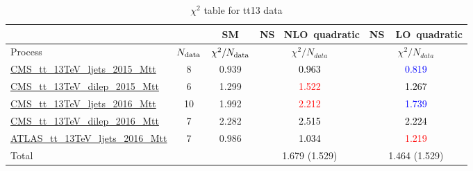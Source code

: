 \documentclass{article}
\begin{document}
\begin{table}[H]
\centering
\begin{tabular}{|l|c|c|c|c|}
\hline
 \multicolumn{2}{|c|}{} & SM& \rm NS \ NLO\ quadratic& \rm NS\ \ LO\ quadratic\\ \hline
Process & $N_{\rm data}$ & $\chi^ 2/N_{\rm data}$& $\chi^ 2/N_{data}$& $\chi^ 2/N_{data}$\\ \hline
\href{https://arxiv.org/abs/1610.04191}{CMS_tt_13TeV_ljets_2015_Mtt} & 8 & 0.939 & \textcolor{black}                            {0.963} & \textcolor{blue}                            {0.819} \\ \hline
\href{https://arxiv.org/abs/1708.07638}{CMS_tt_13TeV_dilep_2015_Mtt} & 6 & 1.299 & \textcolor{red}                            {1.522} & \textcolor{black}                            {1.267} \\ \hline
\href{https://arxiv.org/abs/1803.08856}{CMS_tt_13TeV_ljets_2016_Mtt} & 10 & 1.992 & \textcolor{red}                            {2.212} & \textcolor{blue}                            {1.739} \\ \hline
\href{https://arxiv.org/abs/1811.06625}{CMS_tt_13TeV_dilep_2016_Mtt} & 7 & 2.282 & \textcolor{black}                            {2.515} & \textcolor{black}                            {2.224} \\ \hline
\href{https://arxiv.org/abs/1908.07305}{ATLAS_tt_13TeV_ljets_2016_Mtt} & 7 & 0.986 & \textcolor{black}                            {1.034} & \textcolor{red}                            {1.219} \\ \hline
\hline Total & &  & 1.679 (1.529) & 1.464 (1.529) \\ \hline
\end{tabular}
\caption{$\chi^2$ table for tt13 data}
\end{table}
\end{document}
